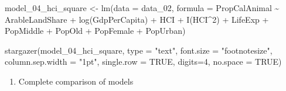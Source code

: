 \documentclass[
  letterpaper,
  DIV=11,
  numbers=noendperiod]{scrartcl}
\newenvironment{Shaded}{\begin{snugshade}}{\end{snugshade}}
\newcommand{\AttributeTok}[1]{\textcolor[rgb]{0.40,0.45,0.13}{#1}}
\newcommand{\ConstantTok}[1]{\textcolor[rgb]{0.56,0.35,0.01}{#1}}
\newcommand{\DecValTok}[1]{\textcolor[rgb]{0.68,0.00,0.00}{#1}}
\newcommand{\FunctionTok}[1]{\textcolor[rgb]{0.28,0.35,0.67}{#1}}
\newcommand{\NormalTok}[1]{\textcolor[rgb]{0.00,0.23,0.31}{#1}}
\newcommand{\OtherTok}[1]{\textcolor[rgb]{0.00,0.23,0.31}{#1}}
\newcommand{\SpecialCharTok}[1]{\textcolor[rgb]{0.37,0.37,0.37}{#1}}
\newcommand{\StringTok}[1]{\textcolor[rgb]{0.13,0.47,0.30}{#1}}
\providecommand{\tightlist}{%
  \setlength{\itemsep}{0pt}\setlength{\parskip}{0pt}}\usepackage{longtable,booktabs,array}
\begin{document}
\begin{Shaded}
\begin{Highlighting}[]
\NormalTok{model\_04\_hci\_square }\OtherTok{\textless{}{-}} \FunctionTok{lm}\NormalTok{(}\AttributeTok{data =}\NormalTok{ data\_02, }
               \AttributeTok{formula =}\NormalTok{ PropCalAnimal }\SpecialCharTok{\textasciitilde{}}\NormalTok{ ArableLandShare }\SpecialCharTok{+} \FunctionTok{log}\NormalTok{(GdpPerCapita) }
               \SpecialCharTok{+}\NormalTok{ HCI }\SpecialCharTok{+} \FunctionTok{I}\NormalTok{(HCI}\SpecialCharTok{\^{}}\DecValTok{2}\NormalTok{) }\SpecialCharTok{+}\NormalTok{ LifeExp }\SpecialCharTok{+}\NormalTok{ PopMiddle }\SpecialCharTok{+}\NormalTok{ PopOld }\SpecialCharTok{+}\NormalTok{ PopFemale }\SpecialCharTok{+}\NormalTok{ PopUrban)}

\FunctionTok{stargazer}\NormalTok{(model\_04\_hci\_square, }\AttributeTok{type =} \StringTok{"text"}\NormalTok{, }\AttributeTok{font.size =} \StringTok{"footnotesize"}\NormalTok{, }
          \AttributeTok{column.sep.width =} \StringTok{"1pt"}\NormalTok{, }\AttributeTok{single.row =} \ConstantTok{TRUE}\NormalTok{,}
          \AttributeTok{digits=}\DecValTok{4}\NormalTok{, }\AttributeTok{no.space =} \ConstantTok{TRUE}\NormalTok{)}
\end{Highlighting}
\end{Shaded}

\begin{enumerate}
\def\labelenumi{\arabic{enumi}.}
\setcounter{enumi}{7}
\tightlist
\item
  Complete comparison of models
\end{enumerate}
\end{document}
